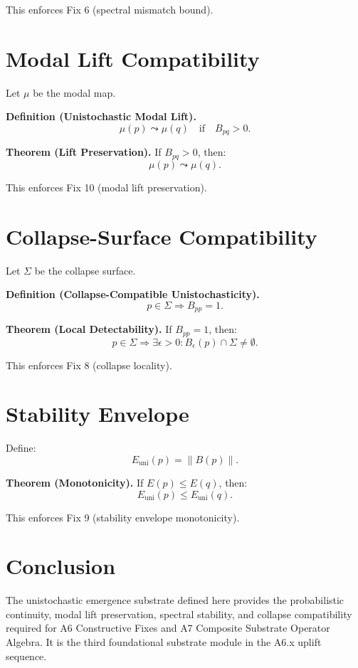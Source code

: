 \documentclass[11pt]{article}
\begin{document}
This enforces Fix 6 (spectral mismatch bound).

\section{Modal Lift Compatibility}

Let $\mu$ be the modal map.

\textbf{Definition (Unistochastic Modal Lift).}
\[
\mu(p) \leadsto \mu(q) \quad \text{if} \quad B_{pq} > 0.
\]

\textbf{Theorem (Lift Preservation).}
If $B_{pq} > 0$, then:
\[
\mu(p) \leadsto \mu(q).
\]

This enforces Fix 10 (modal lift preservation).

\section{Collapse-Surface Compatibility}

Let $\Sigma$ be the collapse surface.

\textbf{Definition (Collapse-Compatible Unistochasticity).}
\[
p \in \Sigma \Rightarrow B_{pp} = 1.
\]

\textbf{Theorem (Local Detectability).}
If $B_{pp} = 1$, then:
\[
p \in \Sigma \Rightarrow \exists \epsilon > 0 :
B_\epsilon(p) \cap \Sigma \neq \emptyset.
\]

This enforces Fix 8 (collapse locality).

\section{Stability Envelope}

Define:
\[
E_{\mathrm{uni}}(p) = \|B(p)\|.
\]

\textbf{Theorem (Monotonicity).}
If $E(p) \le E(q)$, then:
\[
E_{\mathrm{uni}}(p) \le E_{\mathrm{uni}}(q).
\]

This enforces Fix 9 (stability envelope monotonicity).

\section{Conclusion}

The unistochastic emergence substrate defined here provides the probabilistic
continuity, modal lift preservation, spectral stability, and collapse
compatibility required for A6 Constructive Fixes and A7 Composite Substrate
Operator Algebra. It is the third foundational substrate module in the A6.x
uplift sequence.
\end{document}
